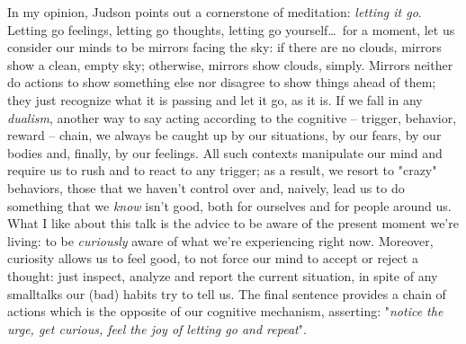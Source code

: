 In my opinion, Judson points out a cornerstone of meditation:
\emph{letting it go}.  Letting go feelings, letting go thoughts,
letting go yourself\ldots\, for a moment, let us consider our minds to be
mirrors facing the sky: if there are no clouds, mirrors show a clean,
empty sky; otherwise, mirrors show clouds, simply. Mirrors neither do
actions to show something else nor disagree to show things ahead of
them; they just recognize what it is passing and let it go, as it
is. If we fall in any \emph{dualism}, another way to say acting
according to the cognitive -- trigger, behavior, reward -- chain, we
always be caught up by our situations, by our fears, by our bodies
and, finally, by our feelings.  All such contexts manipulate our mind
and require us to rush and to react to any trigger; as a result, we
resort to "crazy" behaviors, those that we haven't control over
and, naively, lead us to do something that we \emph{know} isn't good,
both for ourselves and for people around us.  What I like about this
talk is the advice to be aware of the present moment we're living: to
be \emph{curiously} aware of what we're experiencing right
now. Moreover, curiosity allows us to feel good, to not force our mind
to accept or reject a thought: just inspect, analyze and report the
current situation, in spite of any smalltalks our (bad) habits try to
tell us.  The final sentence provides a chain of actions which is the
opposite of our cognitive mechanism, asserting: "\emph{notice the
  urge, get curious, feel the joy of letting go and repeat}".

